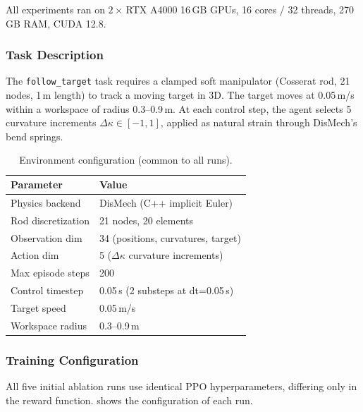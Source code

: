 \documentclass[11pt]{article}
\begin{document}
All experiments ran on $2{\times}$\,RTX A4000 16\,GB GPUs, 16 cores / 32 threads, 270\,GB RAM, CUDA 12.8.

\subsubsection{Task Description}
\label{sec:rl-dismech:task}

The \texttt{follow\_target} task requires a clamped soft manipulator (Cosserat rod, 21 nodes, 1\,m length) to track a moving target in 3D.
The target moves at 0.05\,m/s within a workspace of radius 0.3--0.9\,m.
At each control step, the agent selects 5 curvature increments $\Delta\kappa \in [-1, 1]$, applied as natural strain through DisMech's bend springs.

\begin{table}[H]
  \centering
  \small
  \renewcommand{\arraystretch}{1.3}
  \caption{Environment configuration (common to all runs).}
  \label{tab:choi2025-env}
  \begin{tabular}{@{}ll@{}}
    \toprule
    \textbf{Parameter} & \textbf{Value} \\
    \midrule
    Physics backend & DisMech (C++ implicit Euler) \\
    Rod discretization & 21 nodes, 20 elements \\
    Observation dim & 34 (positions, curvatures, target) \\
    Action dim & 5 ($\Delta\kappa$ curvature increments) \\
    Max episode steps & 200 \\
    Control timestep & 0.05\,s (2 substeps at dt=0.05\,s) \\
    Target speed & 0.05\,m/s \\
    Workspace radius & 0.3--0.9\,m \\
    \bottomrule
  \end{tabular}
\end{table}

\subsubsection{Training Configuration}
\label{sec:rl-dismech:setup}

All five initial ablation runs use identical PPO hyperparameters, differing only in the reward function.
 shows the configuration of each run.
\end{document}
